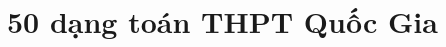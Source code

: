 

	\renewcommand{\chaptername}{Chuyên đề} %
	\tableofcontents %
	\clearpage%
\chapter{50 dạng toán THPT Quốc Gia}
	


